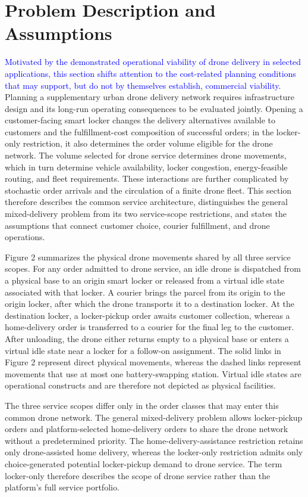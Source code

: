 \documentclass[final,3p,authoryear]{elsarticle}
\begin{document}
\section{Problem Description and Assumptions}
\label{sec:assumptions}


\textcolor{blue}{Motivated by the demonstrated operational viability of drone delivery in selected applications, this section shifts attention to the cost-related planning conditions that may support, but do not by themselves establish, commercial viability.}
Planning a supplementary urban drone delivery network requires infrastructure design and its long-run operating consequences to be evaluated jointly. Opening a customer-facing smart locker changes the delivery alternatives available to customers and the fulfillment-cost composition of successful orders; in the locker-only restriction, it also determines the order volume eligible for the drone network. The volume selected for drone service determines drone movements, which in turn determine vehicle availability, locker congestion, energy-feasible routing, and fleet requirements. These interactions are further complicated by stochastic order arrivals and the circulation of a finite drone fleet. This section therefore describes the common service architecture, distinguishes the general mixed-delivery problem from its two service-scope restrictions, and states the assumptions that connect customer choice, courier fulfillment, and drone operations.

Figure 2 summarizes the physical drone movements shared by all three service scopes. For any order admitted to drone service, an idle drone is dispatched from a physical base to an origin smart locker or released from a virtual idle state associated with that locker. A courier brings the parcel from its origin to the origin locker, after which the drone transports it to a destination locker. At the destination locker, a locker-pickup order awaits customer collection, whereas a home-delivery order is transferred to a courier for the final leg to the customer. After unloading, the drone either returns empty to a physical base or enters a virtual idle state near a locker for a follow-on assignment. The solid links in Figure 2 represent direct physical movements, whereas the dashed links represent movements that use at most one battery-swapping station. Virtual idle states are operational constructs and are therefore not depicted as physical facilities.

\color{blue}
The three service scopes differ only in the order classes that may enter this common drone network.
The general mixed-delivery problem allows locker-pickup orders and platform-selected home-delivery orders to share the drone network without a predetermined priority.
The home-delivery-assistance restriction retains only drone-assisted home delivery, whereas the locker-only restriction admits only choice-generated potential locker-pickup demand to drone service.
The term locker-only therefore describes the scope of drone service rather than the platform's full service portfolio.
\end{document}
